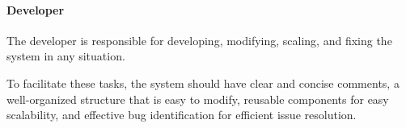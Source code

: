 \paragraph{Developer}


The developer is responsible for developing, modifying, 
scaling, and fixing the system in any situation.

To facilitate these tasks, the system should have clear 
and concise comments,
a well-organized structure that is easy 
to modify, reusable components for easy scalability, 
and effective bug identification for efficient issue resolution.

